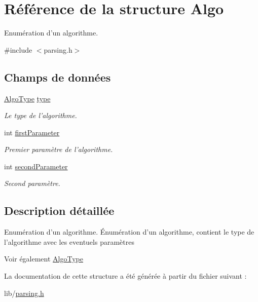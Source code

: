 \hypertarget{structAlgo}{
\section{Référence de la structure Algo}
\label{structAlgo}
}


Enumération d'un algorithme.  




{\ttfamily \#include $<$parsing.h$>$}

\subsection*{Champs de données}
\begin{DoxyCompactItemize}
\item 
\hypertarget{structAlgo_ac238c59b48a6658c527f7ee987e0daac}{
\hyperlink{parsing_8h_aebdeb51354d2ee712846a9e02786cd74}{AlgoType} \hyperlink{structAlgo_ac238c59b48a6658c527f7ee987e0daac}{type}}
\label{structAlgo_ac238c59b48a6658c527f7ee987e0daac}

\begin{DoxyCompactList}\small\item\em Le type de l'algorithme. \item\end{DoxyCompactList}\item 
\hypertarget{structAlgo_a715ddb57a67fbadc6771d167f20d1d2e}{
int \hyperlink{structAlgo_a715ddb57a67fbadc6771d167f20d1d2e}{firstParameter}}
\label{structAlgo_a715ddb57a67fbadc6771d167f20d1d2e}

\begin{DoxyCompactList}\small\item\em Premier paramètre de l'algorithme. \item\end{DoxyCompactList}\item 
\hypertarget{structAlgo_a73bb72b60e1d63c33843ace474b7d957}{
int \hyperlink{structAlgo_a73bb72b60e1d63c33843ace474b7d957}{secondParameter}}
\label{structAlgo_a73bb72b60e1d63c33843ace474b7d957}

\begin{DoxyCompactList}\small\item\em Second paramètre. \item\end{DoxyCompactList}\end{DoxyCompactItemize}


\subsection{Description détaillée}
Enumération d'un algorithme. Énumération d'un algorithme, contient le type de l'algorithme avec les eventuels paramètres

\begin{DoxySeeAlso}{Voir également}
\hyperlink{parsing_8h_aebdeb51354d2ee712846a9e02786cd74}{AlgoType} 
\end{DoxySeeAlso}


La documentation de cette structure a été générée à partir du fichier suivant :\begin{DoxyCompactItemize}
\item 
lib/\hyperlink{parsing_8h}{parsing.h}\end{DoxyCompactItemize}
